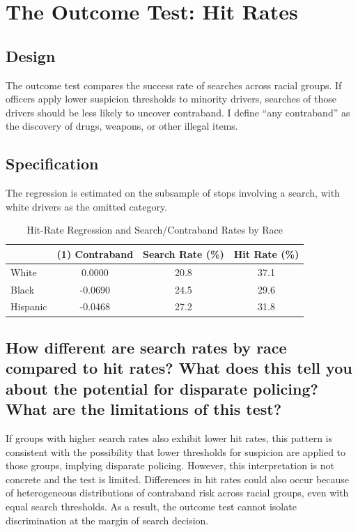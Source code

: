 \documentclass[11pt]{article}
\begin{document}
\section{The Outcome Test: Hit Rates}
\label{sec:hitrate}

\subsection*{Design}

The outcome test compares the success rate of searches across racial groups.
If officers apply lower suspicion thresholds to minority drivers, searches of
those drivers should be less likely to uncover contraband. I define ``any
contraband'' as the discovery of drugs, weapons, or other illegal items.

\subsection*{Specification}

The regression is estimated on the subsample of stops involving a search, with white drivers as the omitted category.

\begin{table}[H]
  \centering
  \caption{Hit-Rate Regression and Search/Contraband Rates by Race}
  \label{tab:hitrate}
  \begin{threeparttable}
    \begin{tabular}{lccc}
      \toprule
      & (1) Contraband & Search Rate (\%) & Hit Rate (\%) \\
      \midrule
      White  
      & 0.0000 
      & 20.8 
      & 37.1 \\
      
      Black 
      & -0.0690 
      & 24.5 
      & 29.6 \\
      
      Hispanic 
      & -0.0468 
      & 27.2 
      & 31.8 \\
    \end{tabular}
  \end{threeparttable}
\end{table}

\subsection*{How different are search rates by race compared to hit rates? What does
this tell you about the potential for disparate policing? What are the limitations of this test?}

If groups with higher search rates also exhibit lower hit rates, this pattern is consistent with the possibility that lower thresholds for suspicion are applied to those groups, implying disparate policing. However, this interpretation is not concrete and the test is limited. Differences in hit rates could also occur because of heterogeneous distributions of contraband risk across racial groups, even with equal search thresholds. As a result, the outcome test cannot isolate discrimination at the margin of search decision.
\end{document}
